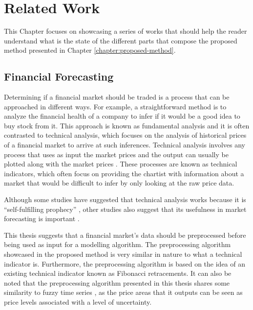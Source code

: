 \chapter{Related Work}
\label{chapter:related-work}

This Chapter focuses on showcasing a series of works that should help the reader
understand what is the state of the different parts that compose the proposed
method presented in Chapter \ref{chapter:proposed-method}.

\section{Financial Forecasting}
\label{section:financial-forecasting}

Determining if a financial market should be traded is a process that can be
approached in different ways. For example, a straightforward method is to
analyze the financial health of a company to infer if it would be a good idea to
buy stock from it. This approach is known as fundamental analysis
\cite{Martinez-Jaramillo2009} and it is often contrasted to technical analysis,
which focuses on the analysis of historical prices of a financial market to
arrive at such inferences. Technical analysis involves any process that uses as
input the market prices and the output can usually be plotted along with the
market prices \cite{Achelis2000}. These processes are known as technical
indicators, which often focus on providing the chartist with information about a
market that would be difficult to infer by only looking at the raw price data.

Although some studies have suggested that technical analysis works because it is
``self-fulfilling prophecy'' \cite{Salganik2008} \cite{Fund1992}, other studies
also suggest that its usefulness in market forecasting is important
\cite{Kadiri2015} \cite{Fund1992}.

This thesis suggests that a financial market's data should be preprocessed
before being used as input for a modelling algorithm. The preprocessing
algorithm showcased in the proposed method is very similar in nature to what a
technical indicator is. Furthermore, the preprocessing algorithm is based on the
idea of an existing technical indicator known as Fibonacci retracements. It can
also be noted that the preprocessing algorithm presented in this thesis shares
some similarity to fuzzy time series \cite{Cai2013}, as the price areas that it
outputs can be seen as price levels associated with a level of uncertainty.

